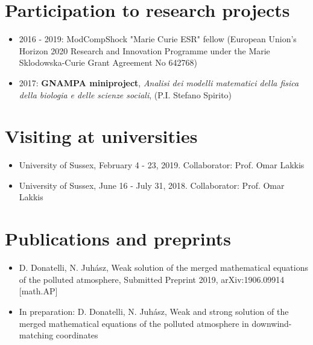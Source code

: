\documentclass[11pt]{article}
\begin{document}
\newpage

\section{Participation to research projects}

\begin{itemize}
  \item 2016 - 2019: ModCompShock "Marie Curie ESR" fellow (European Union's Horizon 2020 Research and Innovation Programme under the Marie Sklodowska-Curie Grant Agreement No 642768)
  \item 2017: \textbf{GNAMPA miniproject}, \textit{Analisi dei modelli matematici della fisica della biologia e delle scienze sociali}, (P.I. Stefano Spirito)
\end{itemize}

\newpage

\section{Visiting at universities}

\begin{itemize}
  \item University of Sussex, February 4 - 23, 2019. Collaborator: Prof. Omar Lakkis
  \item University of Sussex, June 16 - July 31, 2018. Collaborator: Prof. Omar Lakkis
\end{itemize}

\newpage

\section{Publications and preprints}

\begin{itemize}

  \item D. Donatelli, N. Juh\'{a}sz, Weak solution of the merged mathematical equations of the polluted atmosphere, Submitted Preprint 2019, arXiv:1906.09914 [math.AP]
  
  \item In preparation: D. Donatelli, N. Juh\'{a}sz, Weak and strong solution of the merged mathematical equations of the polluted atmosphere in downwind-matching coordinates

\end{itemize}
\end{document}
